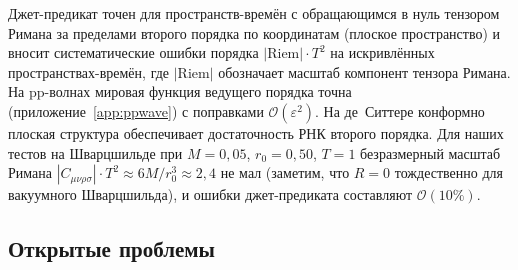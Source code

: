 \documentclass[12pt,a4paper]{article}
\theoremstyle{plain}
\theoremstyle{definition}
\theoremstyle{remark}
\newcommand{\order}{\mathcal{O}}
\begin{document}
Джет-предикат точен для пространств-времён с обращающимся
в нуль тензором Римана за пределами второго порядка по
координатам (плоское пространство) и вносит систематические
ошибки порядка $|\mathrm{Riem}| \cdot T^2$ на искривлённых
пространствах-времён, где $|\mathrm{Riem}|$ обозначает масштаб
компонент тензора Римана.  На pp-волнах мировая функция
ведущего порядка точна (приложение~\ref{app:ppwave}) с
поправками $\order(\varepsilon^2)$.  На де~Ситтере конформно
плоская структура обеспечивает достаточность РНК второго
порядка.  Для наших тестов на Шварцшильде при $M = 0{,}05$,
$r_0 = 0{,}50$, $T = 1$ безразмерный масштаб Римана
$|C_{\mu\nu\rho\sigma}| \cdot T^2 \approx 6M/r_0^3 \approx 2{,}4$
не мал (заметим, что $R = 0$ тождественно для вакуумного
Шварцшильда), и ошибки джет-предиката составляют
$\order(10\%)$.

\subsection{Открытые проблемы}
\label{sec:open}
\end{document}
